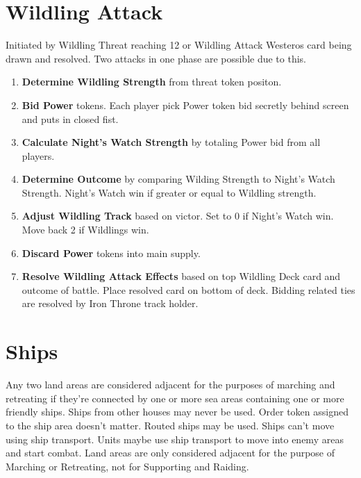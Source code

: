 \documentclass[12pt]{article}
\newenvironment{enumerateCustom}
{\begin{enumerate}
  \setlength{\itemsep}{1pt}
  \setlength{\parskip}{0pt}
  \setlength{\parsep}{0pt}}
{\end{enumerate}}
\begin{document}
\begin{multicols*}{2}
\section*{Wildling Attack}
Initiated by Wildling Threat reaching 12 or Wildling Attack Westeros card being drawn and resolved. Two attacks in one phase are possible due to this.
\begin{enumerateCustom}
	\item \textbf{Determine Wildling Strength} from threat token positon.
	\item \textbf{Bid Power} tokens. Each player pick Power token bid secretly behind screen and puts in closed fist.
	\item \textbf{Calculate Night's Watch Strength} by totaling Power bid from all players.
	\item \textbf{Determine Outcome} by comparing Wilding Strength to Night's Watch Strength. Night's Watch win if greater or equal to Wildling strength.
	\item \textbf{Adjust Wildling Track} based on victor. Set to 0 if Night's Watch win. Move back 2 if Wildlings win.
	\item \textbf{Discard Power} tokens into main supply.
	\item \textbf{Resolve Wildling Attack Effects} based on top Wildling Deck card and outcome of battle. Place resolved card on bottom of deck. Bidding related ties are resolved by Iron Throne track holder.
\end{enumerateCustom}

\section*{Ships}
Any two land areas are considered adjacent for the purposes of marching and retreating if they're connected by one or more sea areas containing one or more friendly ships. Ships from other houses may never be used. Order token assigned to the ship area doesn't matter. Routed ships may be used. Ships can't move using ship transport. Units maybe use ship transport to move into enemy areas and start combat. Land areas are only considered adjacent for the purpose of Marching or Retreating, not for Supporting and Raiding.


\end{multicols*}
\end{document}

